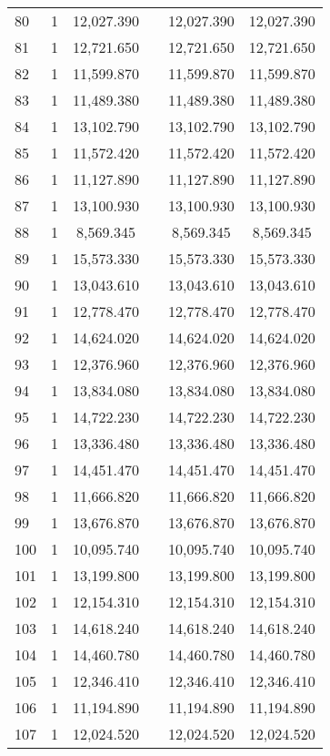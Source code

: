 \begin{table}[!htbp]
\begin{tabular}{@{\extracolsep{5pt}}lccccc}
80 & 1 & 12,027.390 &  & 12,027.390 & 12,027.390 \\ 
81 & 1 & 12,721.650 &  & 12,721.650 & 12,721.650 \\ 
82 & 1 & 11,599.870 &  & 11,599.870 & 11,599.870 \\ 
83 & 1 & 11,489.380 &  & 11,489.380 & 11,489.380 \\ 
84 & 1 & 13,102.790 &  & 13,102.790 & 13,102.790 \\ 
85 & 1 & 11,572.420 &  & 11,572.420 & 11,572.420 \\ 
86 & 1 & 11,127.890 &  & 11,127.890 & 11,127.890 \\ 
87 & 1 & 13,100.930 &  & 13,100.930 & 13,100.930 \\ 
88 & 1 & 8,569.345 &  & 8,569.345 & 8,569.345 \\ 
89 & 1 & 15,573.330 &  & 15,573.330 & 15,573.330 \\ 
90 & 1 & 13,043.610 &  & 13,043.610 & 13,043.610 \\ 
91 & 1 & 12,778.470 &  & 12,778.470 & 12,778.470 \\ 
92 & 1 & 14,624.020 &  & 14,624.020 & 14,624.020 \\ 
93 & 1 & 12,376.960 &  & 12,376.960 & 12,376.960 \\ 
94 & 1 & 13,834.080 &  & 13,834.080 & 13,834.080 \\ 
95 & 1 & 14,722.230 &  & 14,722.230 & 14,722.230 \\ 
96 & 1 & 13,336.480 &  & 13,336.480 & 13,336.480 \\ 
97 & 1 & 14,451.470 &  & 14,451.470 & 14,451.470 \\ 
98 & 1 & 11,666.820 &  & 11,666.820 & 11,666.820 \\ 
99 & 1 & 13,676.870 &  & 13,676.870 & 13,676.870 \\ 
100 & 1 & 10,095.740 &  & 10,095.740 & 10,095.740 \\ 
101 & 1 & 13,199.800 &  & 13,199.800 & 13,199.800 \\ 
102 & 1 & 12,154.310 &  & 12,154.310 & 12,154.310 \\ 
103 & 1 & 14,618.240 &  & 14,618.240 & 14,618.240 \\ 
104 & 1 & 14,460.780 &  & 14,460.780 & 14,460.780 \\ 
105 & 1 & 12,346.410 &  & 12,346.410 & 12,346.410 \\ 
106 & 1 & 11,194.890 &  & 11,194.890 & 11,194.890 \\ 
107 & 1 & 12,024.520 &  & 12,024.520 & 12,024.520 \\ 

\end{tabular}
\end{table}
